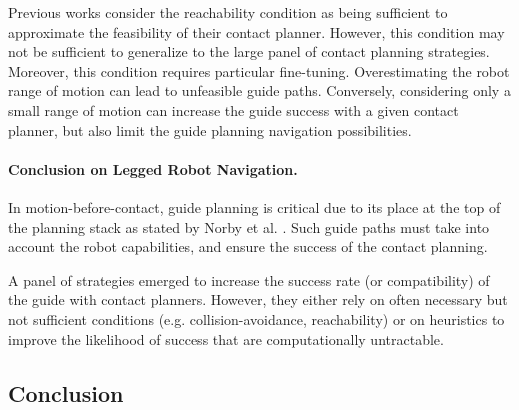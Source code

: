 Previous works consider the reachability condition as being sufficient to approximate the feasibility of their contact planner. However, this condition may not be sufficient to generalize to the large panel of contact planning strategies.
Moreover, this condition requires particular fine-tuning.
Overestimating the robot range of motion can lead to unfeasible guide paths.
Conversely, considering only a small range of motion can increase the guide success with a given contact planner, but also limit the guide planning navigation possibilities.



\paragraph{Conclusion on Legged Robot Navigation.}
In motion-before-contact, guide planning is critical due to its place at the top of the planning stack as stated by Norby et al. \cite{norby_skd_2022}.
Such guide paths must take into account the robot capabilities, and ensure the success of the contact planning.

A panel of strategies emerged to increase the success rate (or compatibility) of the guide with contact planners.
However, they either rely on often necessary but not sufficient conditions (e.g. collision-avoidance, reachability) or on heuristics to improve the likelihood of success that are computationally untractable.


\subsection{Conclusion}

